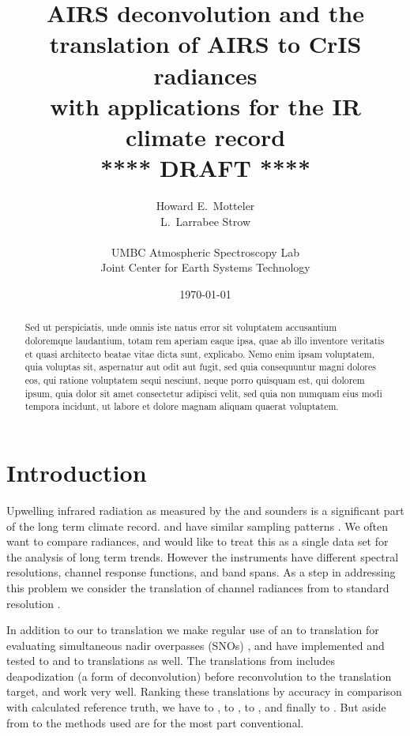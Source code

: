 \documentclass[10pt,twocolumn]{article}
\title{AIRS deconvolution and the \\
       translation of AIRS to CrIS radiances \\ 
       with applications for the IR climate record \\
  \vspace{3mm}
  {****} DRAFT {****}\\
}
\author{Howard E.~Motteler \\
  L.~Larrabee Strow \\
  \\
  UMBC Atmospheric Spectroscopy Lab \\
  Joint Center for Earth Systems Technology \\
}
\date{\today}
\begin{document}
\maketitle

\begin{abstract}
Sed ut perspiciatis, unde omnis iste natus error sit voluptatem
accusantium doloremque laudantium, totam rem aperiam eaque ipsa,
quae ab illo inventore veritatis et quasi architecto beatae vitae
dicta sunt, explicabo. Nemo enim ipsam voluptatem, quia voluptas
sit, aspernatur aut odit aut fugit, sed quia consequuntur magni
dolores eos, qui ratione voluptatem sequi nesciunt, neque porro
quisquam est, qui dolorem ipsum, quia dolor sit amet consectetur
adipisci velit, sed quia non numquam eius modi tempora incidunt, ut
labore et dolore magnam aliquam quaerat voluptatem.
\end{abstract}

\section{Introduction}

Upwelling infrared radiation as measured by the {\airs} \cite{airs1}
and {\cris} \cite{cris1,cris2} sounders is a significant part of the
long term climate record.  {\airs} and {\cris} have similar sampling
patterns \cite{git:acsamp}.  We often want to compare radiances, and
would like to treat this as a single data set for the analysis of
long term trends.  However the instruments have different spectral
resolutions, channel response functions, and band spans.  As a step
in addressing this problem we consider the translation of channel
radiances from {\airs} to standard resolution {\cris}.

In addition to our {\airs} to {\cris} translation we make regular
use of an {\iasi} to {\cris} translation for evaluating simultaneous
nadir overpasses (SNOs) \cite{sno1}, and have implemented and tested
{\iasi} to {\airs} and {\cris} to {\airs} translations as well.  The
translations from {\iasi} includes deapodization (a form of
deconvolution) before reconvolution to the translation target, and
work very well.  Ranking these translations by accuracy in
comparison with calculated reference truth, we have {\iasi} to
{\cris}, {\iasi} to {\airs}, {\airs} to {\cris}, and finally {\cris}
to {\airs} \cite{git:decon}.  But aside from {\airs} to {\cris} the
methods used are for the most part conventional.
\end{document}
